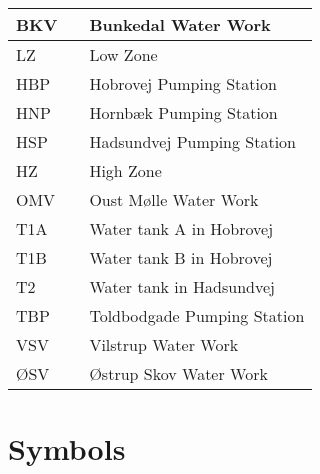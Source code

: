 	\begin{tabular}{|l c l|} \hline
		BKV     &&	Bunkedal Water Work 									\\ \hline
		LZ      &&	Low Zone												\\ \hline
		HBP     &&	Hobrovej Pumping Station 								\\ \hline
		HNP     &&	Hornbæk Pumping Station 								\\ \hline
		HSP 	&&	Hadsundvej Pumping Station 								\\ \hline		
		HZ      &&	High Zone												\\ \hline
		OMV		&&	Oust Mølle Water Work 									\\ \hline
		T1A 	&&	Water tank A in Hobrovej 								\\ \hline
		T1B 	&&	Water tank B in Hobrovej 								\\ \hline
		T2 		&&	Water tank in Hadsundvej 								\\ \hline
		TBP 	&&	Toldbodgade Pumping Station 							\\ \hline
		VSV 	&&	Vilstrup Water Work 									\\ \hline
		ØSV 	&&	Østrup Skov Water Work 									\\ \hline
	\end{tabular}

\newpage

\section*{Symbols}


